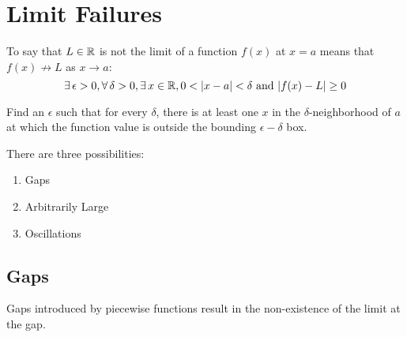\documentclass[letterpaper,12pt,fleqn]{article}
\newcommand{\e}{\epsilon}
\renewcommand{\d}{\delta}
\begin{document}
\section*{Limit Failures}

\begin{definition}
  To say that \(L\in\mathbb{R}\) is not the limit of a function \(f(x)\) at \(x=a\) means that \(f(x)\not\to L\) as
  \(x\to a\):
  \[\exists\,\e>0,\forall\,\d>0,\exists\,x\in\R,0<\abs{x-a}<\d\ \text{and}\ \abs{f(x)-L}\ge0\]
\end{definition}

Find an \(\e\) such that for every \(\d\), there is at least one \(x\) in the \(\d\)-neighborhood of \(a\) at which
the function value is outside the bounding \(\e-\d\) box.

There are three possibilities:
\begin{enumerate}
\item Gaps
\item Arbitrarily Large
\item Oscillations
\end{enumerate}

\subsection*{Gaps}

Gaps introduced by piecewise functions result in the non-existence of the limit at the gap.
\end{document}
